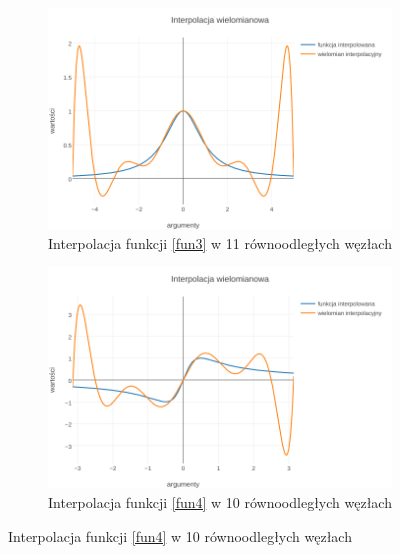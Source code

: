 \documentclass{article}
\begin{document}
\begin{figure}[ht]
	\centering
	\begin{subfigure}[ht]{0.5\textwidth}
		\includegraphics[width=\textwidth]{lagrange_c}
		\caption{Interpolacja funkcji \eqref{fun3} w 11 równoodległych węzłach}
		\label{fig:2}
	\end{subfigure}%
	\begin{subfigure}[ht]{0.5\textwidth}
		\includegraphics[width=\textwidth]{lagrange_d}
		\caption{Interpolacja funkcji \eqref{fun4} w 10 równoodległych węzłach}
		\label{fig:3}
	\end{subfigure}
\end{figure}
\end{document}

